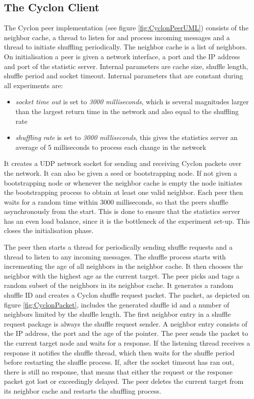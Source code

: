 \subsection{The Cyclon Client}
The Cyclon peer implementation (see figure \ref{fig:CyclonPeerUML}) consists
of the neighbor cache, a thread to listen for and process incoming messages and a thread to initiate shuffling
periodically. The neighbor cache is a list of neighbors. On initialisation a
peer is given a network interface, a port and the IP address and port of the
statistic server. Internal parameters are cache size, shuffle length, shuffle
period and socket timeout. Internal parameters that are constant during all
experiments are:
\begin{itemize}
  \item \emph{socket time out} is set to \emph{3000 milliseconds}, which is
  several magnitudes larger than the largest return time in the network and also
  equal to the shuffling rate
  \item \emph{shuffling rate} is set to \emph{3000 milliseconds}, this gives the
  statistics server an average of 5 milliseconds to process each change in the
  network
\end{itemize}
It creates a UDP network socket for sending and receiving Cyclon packets over
the network. It can also be given a seed or bootstrapping node. If not given a
bootstrapping node or whenever the neighbor cache is empty the node initiates
the bootstrapping process to obtain at least one valid neighbor. Each peer then
waits for a random time within 3000 milliseconds, so that the peers shuffle
asynchronously from the start. This is done to ensure that the statistics
server has an even load balance, since it is the bottleneck of the experiment
set-up. This closes the initialisation phase.

The peer then starts a thread for periodically sending shuffle requests and a
thread to listen to any incoming messages. The shuffle process starts with
incrementing the age of all neighbors in the neighbor cache. It then chooses
the neighbor with the highest age as the current target. The peer picks and
tags a random subset of the neighbors in its neighbor cache. It generates a
random shuffle ID and creates a Cyclon shuffle request packet. The packet, as
depicted on figure \ref{fig:CyclonPacket}, includes the generated shuffle id
and a number of neighbors limited by the shuffle length.
The first neighbor entry in a shuffle request package is always the shuffle
request sender. A neighbor entry consists of the IP address, the port and the
age of the pointer. The peer sends the packet to the current target node and
waits for a response. If the listening thread receives a response it notifies
the shuffle thread, which then waits for the shuffle period before restarting
the shuffle process. If, after the socket timeout has ran out, there is still
no response, that means that either the request or the response packet got lost
or exceedingly delayed. The peer deletes the current target from its neighbor cache
and restarts the shuffling process.

